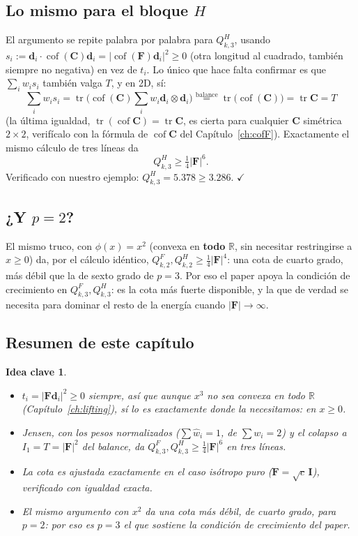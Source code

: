 \documentclass[11pt,a4paper]{article}
\newtheorem{takeaway}{Idea clave}
\newcommand{\Cof}{\operatorname{cof}}
\newcommand{\tr}{\operatorname{tr}}
\newcommand{\R}{\mathbb{R}}
\begin{document}
\subsection{Lo mismo para el bloque $H$}

El argumento se repite palabra por palabra para $Q_{k,3}^H$, usando
$s_i:=\bm d_i\cdot\Cof(\bm C)\bm d_i=|\Cof(\bm F)\bm d_i|^2\geq0$ (otra
longitud al cuadrado, tambi\'en siempre no negativa) en vez de $t_i$.
Lo \'unico que hace falta confirmar es que $\sum_iw_is_i$ tambi\'en
valga $T$, y en 2D, s\'i:
\[
 \sum_iw_is_i=\tr\Big(\Cof(\bm C)\sum_iw_i\bm d_i\otimes\bm d_i\Big)
 \overset{\text{balance}}{=}\tr\big(\Cof(\bm C)\big)=\tr\bm C=T
\]
(la \'ultima igualdad, $\tr(\Cof\bm C)=\tr\bm C$, es cierta para
cualquier $\bm C$ sim\'etrica $2\times2$, verif\'icalo con la
f\'ormula de $\Cof\bm C$ del Cap\'itulo~\ref{ch:cofF}). Exactamente el
mismo c\'alculo de tres l\'ineas da
\begin{equation}
 Q_{k,3}^H\geq\tfrac14|\bm F|^6.
 \label{eq:appB-growth-H}
\end{equation}
Verificado con nuestro ejemplo: $Q_{k,3}^H=5.378\geq3.286$.
$\checkmark$

\subsection{¿Y $p=2$?}

El mismo truco, con $\phi(x)=x^2$ (convexa en \textbf{todo} $\R$, sin
necesitar restringirse a $x\geq0$) da, por el c\'alculo id\'entico,
$Q_{k,2}^F,Q_{k,2}^H\geq\tfrac14|\bm F|^4$: una cota de cuarto grado,
m\'as d\'ebil que la de sexto grado de $p=3$. Por eso el paper apoya
la condici\'on de crecimiento en $Q_{k,3}^F,Q_{k,3}^H$: es la cota
m\'as fuerte disponible, y la que de verdad se necesita para dominar
el resto de la energ\'ia cuando $|\bm F|\to\infty$.

\subsection{Resumen de este cap\'itulo}

\begin{takeaway}
\begin{itemize}
\item $t_i=|\bm F\bm d_i|^2\geq0$ siempre, as\'i que aunque $x^3$ no
sea convexa en todo $\R$ (Cap\'itulo~\ref{ch:lifting}), s\'i lo es
exactamente donde la necesitamos: en $x\geq0$.
\item Jensen, con los pesos normalizados ($\sum\hat w_i=1$, de
$\sum w_i=2$) y el colapso a $I_1=T=|\bm F|^2$ del balance, da
$Q_{k,3}^F,Q_{k,3}^H\geq\tfrac14|\bm F|^6$ en tres l\'ineas.
\item La cota es ajustada exactamente en el caso is\'otropo puro
($\bm F=\sqrt{c}\,\bm I$), verificado con igualdad exacta.
\item El mismo argumento con $x^2$ da una cota m\'as d\'ebil, de
cuarto grado, para $p=2$: por eso es $p=3$ el que sostiene la
condici\'on de crecimiento del paper.
\end{itemize}
\end{takeaway}
\end{document}
